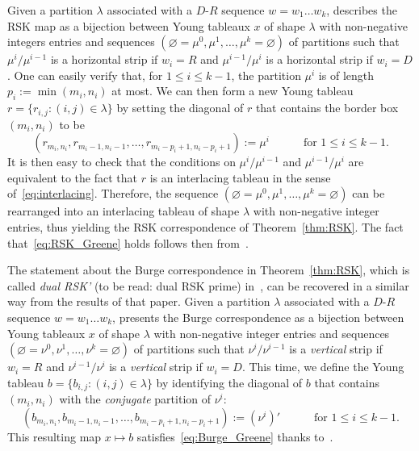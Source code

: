 \documentclass[a4paper,reqno,12pt]{amsart}
\theoremstyle{plain}
\theoremstyle{definition}
\newcommand{\1}{\mathbbm{1}}
\renewcommand{\emptyset}{\varnothing}
\begin{document}
Given a partition $\lambda$ associated with a $D$-$R$ sequence $w=w_1\dots w_k$, \cite[Theorem~7]{krattenthaler06} describes the RSK map as a bijection between Young tableaux $x$ of shape $\lambda$ with non-negative integers entries and sequences $(\emptyset = \mu^0, \mu^1,\dots, \mu^k = \emptyset)$ of partitions such that $\mu^i / \mu^{i-1}$ is a horizontal strip if $w_i=R$ and $\mu^{i-1} / \mu^i$ is a horizontal strip if $w_i=D$.
One can easily verify that, for $1\leq i\leq k-1$, the partition $\mu^i$ is of length $p_i := \min(m_i,n_i)$ at most.
We can then form a new Young tableau $r=\{r_{i,j} \colon (i,j)\in \lambda\}$ by setting the diagonal of $r$ that contains the border box $(m_i,n_i)$ to be
\[
(r_{m_i,n_i}, r_{m_i-1,n_i-1}, \dots, r_{m_i-p_i+1, n_i - p_i +1}) := \mu^i \qquad\quad
\text{for $1\leq i\leq k-1$.}
\]
It is then easy to check that the conditions on $\mu^i / \mu^{i-1}$ and $\mu^{i-1} / \mu^i$ are equivalent to the fact that $r$ is an interlacing tableau in the sense of~\eqref{eq:interlacing}.
Therefore, the sequence $(\emptyset = \mu^0, \mu^1,\dots, \mu^k = \emptyset)$ can be rearranged into an interlacing tableau of shape $\lambda$ with non-negative integer entries, thus yielding the RSK correspondence of Theorem~\ref{thm:RSK}.
The fact that~\eqref{eq:RSK_Greene} holds follows then from~\cite[Theorem~8-(G\textsuperscript{1}1)]{krattenthaler06}.

The statement about the Burge correspondence in Theorem~\ref{thm:RSK}, which is called \emph{dual RSK'} (to be read: dual RSK prime) in~\cite{krattenthaler06}, can be recovered in a similar way from the results of that paper.
Given a partition $\lambda$ associated with a $D$-$R$ sequence $w=w_1\dots w_k$, \cite[Theorem~11]{krattenthaler06} presents the Burge correspondence as a bijection between Young tableaux $x$ of shape $\lambda$ with non-negative integer entries and sequences $(\emptyset = \nu^0, \nu^1,\dots, \nu^k = \emptyset)$ of partitions such that $\nu^i / \nu^{i-1}$ is a \emph{vertical} strip if $w_i=R$ and $\nu^{i-1} / \nu^i$ is a \emph{vertical} strip if $w_i=D$.
This time, we define the Young tableau $b=\{b_{i,j} \colon (i,j)\in \lambda\}$ by identifying the diagonal of $b$ that contains $(m_i,n_i)$ with the \emph{conjugate} partition of $\nu^i$:
\[
(b_{m_i,n_i}, b_{m_i-1,n_i-1}, \dots, b_{m_i-p_i+1, n_i - p_i +1}) := (\nu^i)' \qquad\quad
\text{for $1\leq i\leq k-1$.}
\]
This resulting map $x\mapsto b$ satisfies~\eqref{eq:Burge_Greene} thanks to~\cite[Theorem~12-(G\textsuperscript{4}2)]{krattenthaler06}.
\end{document}
